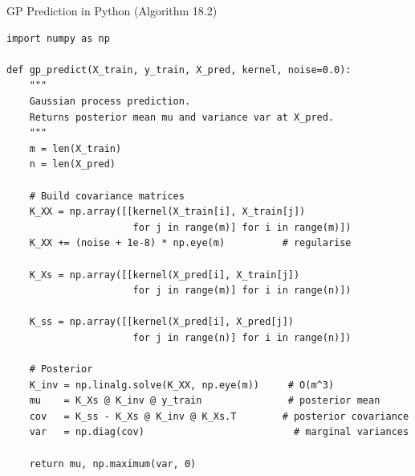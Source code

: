 \documentclass[aspectratio=169,10pt]{beamer}
\begin{document}
\begin{frame}[fragile]{GP Prediction in Python (Algorithm 18.2)}
\begin{lstlisting}
import numpy as np

def gp_predict(X_train, y_train, X_pred, kernel, noise=0.0):
    """
    Gaussian process prediction.
    Returns posterior mean mu and variance var at X_pred.
    """
    m = len(X_train)
    n = len(X_pred)

    # Build covariance matrices
    K_XX = np.array([[kernel(X_train[i], X_train[j])
                      for j in range(m)] for i in range(m)])
    K_XX += (noise + 1e-8) * np.eye(m)          # regularise

    K_Xs = np.array([[kernel(X_pred[i], X_train[j])
                      for j in range(m)] for i in range(n)])

    K_ss = np.array([[kernel(X_pred[i], X_pred[j])
                      for j in range(n)] for i in range(n)])

    # Posterior
    K_inv = np.linalg.solve(K_XX, np.eye(m))     # O(m^3)
    mu    = K_Xs @ K_inv @ y_train               # posterior mean
    cov   = K_ss - K_Xs @ K_inv @ K_Xs.T        # posterior covariance
    var   = np.diag(cov)                          # marginal variances

    return mu, np.maximum(var, 0)
\end{lstlisting}
\end{frame}
\end{document}
